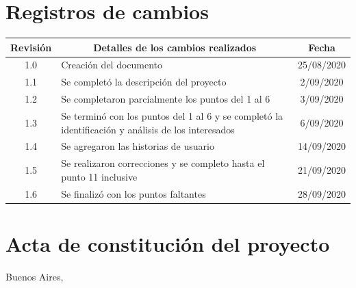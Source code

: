 \documentclass[11pt]{charter}
\begin{document}
\maketitle
\thispagestyle{empty}
\pagebreak


\thispagestyle{empty}
{\setlength{\parskip}{0pt}
\tableofcontents{}
}
\pagebreak


\section{Registros de cambios}
\label{sec:registro}


\begin{table}[ht]
\label{tab:registro}
\centering
\begin{tabularx}{\linewidth}{@{}|c|X|c|@{}}
\hline
\rowcolor[HTML]{C0C0C0} 
Revisión & \multicolumn{1}{c|}{\cellcolor[HTML]{C0C0C0}Detalles de los cambios realizados} & Fecha      \\ \hline
1.0      & Creación del documento                                          & 25/08/2020 \\ \hline
1.1      & Se completó la descripción del proyecto & 2/09/2020 \\ \hline
1.2      & Se completaron parcialmente los puntos del 1 al 6 & 3/09/2020 \\ \hline
1.3		& Se terminó con los puntos del 1 al 6 y se completó la identificación y análisis de los interesados & 6/09/2020 \\ \hline
1.4     & Se agregaron las historias de usuario & 14/09/2020 \\ \hline
1.5		& Se realizaron correcciones y se completo hasta el punto 11 inclusive & 21/09/2020 \\ \hline
1.6     & Se finalizó con los puntos faltantes & 28/09/2020 \\ \hline
\end{tabularx}
\end{table}

\pagebreak



\section{Acta de constitución del proyecto}
\label{sec:acta}

\begin{flushright}
Buenos Aires, \fechaInicioName
\end{flushright}

\vspace{2cm}
\end{document}

